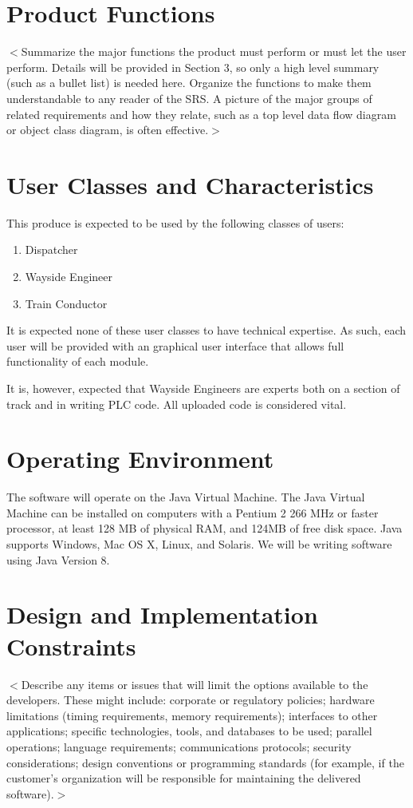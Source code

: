 \documentclass{scrreprt}
\begin{document}
\section{Product Functions}
$<$Summarize the major functions the product must perform or must let the user 
perform. Details will be provided in Section 3, so only a high level summary 
(such as a bullet list) is needed here. Organize the functions to make them 
understandable to any reader of the SRS. A picture of the major groups of 
related requirements and how they relate, such as a top level data flow diagram 
or object class diagram, is often effective.$>$

\section{User Classes and Characteristics}
This produce is expected to be used by the following classes of users:
\begin{enumerate}
    \item Dispatcher
    \item Wayside Engineer
    \item Train Conductor
\end{enumerate}

It is expected none of these user classes to have technical expertise. As such,
each user will be provided with an graphical user interface that allows full
functionality of each module.

It is, however, expected that Wayside Engineers are experts both on a section
of track and in writing PLC code. All uploaded code is considered vital.

\section{Operating Environment}
The software will operate on the Java Virtual Machine. The Java Virtual Machine
can be installed on computers with a Pentium 2 266 MHz or faster processor, at
least 128 MB of physical RAM, and 124MB of free disk space. Java supports Windows,
Mac OS X, Linux, and Solaris. We will be writing software using Java Version 8.

\section{Design and Implementation Constraints}
$<$Describe any items or issues that will limit the options available to the 
developers. These might include: corporate or regulatory policies; hardware 
limitations (timing requirements, memory requirements); interfaces to other 
applications; specific technologies, tools, and databases to be used; parallel 
operations; language requirements; communications protocols; security 
considerations; design conventions or programming standards (for example, if the 
customer’s organization will be responsible for maintaining the delivered 
software).$>$
\end{document}

